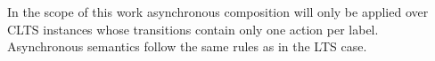 
In the scope of this work asynchronous composition will only be applied over CLTS instances whose transitions contain only one action per label. Asynchronous semantics follow the same rules as in the LTS case.


